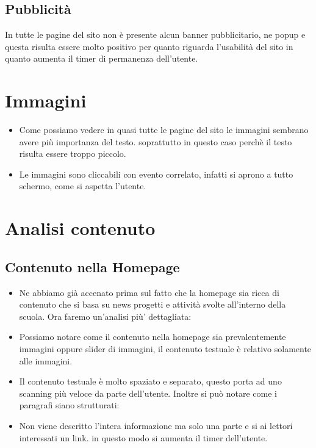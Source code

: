 \documentclass[12pt]{article}
\begin{document}
\subsection{Pubblicit\`a}
In tutte le pagine del sito non \`e presente alcun banner pubblicitario, ne popup e questa risulta essere molto positivo per quanto riguarda l'usabilit\`a del sito in quanto aumenta il timer di permanenza dell'utente.

\section{Immagini}
\begin{itemize}
\item Come possiamo vedere in quasi tutte le pagine del sito le immagini sembrano avere pi\`u importanza del testo. soprattutto in questo caso perch\`e il testo risulta essere troppo piccolo.

\item Le immagini sono cliccabili con evento correlato, infatti si aprono a tutto schermo, come si aspetta l'utente.
\end{itemize}

\section{Analisi contenuto}
\subsection{Contenuto nella Homepage}
\begin{itemize}
	\item Ne abbiamo gi\`a accenato prima sul fatto che la homepage sia ricca di contenuto che si basa su news progetti e attivit\`a svolte all'interno della scuola. Ora faremo un'analisi pi\`u' dettagliata:

	\item Possiamo notare come il contenuto nella homepage sia prevalentemente immagini oppure slider di immagini, il contenuto testuale \`e relativo solamente alle immagini. 
	\item Il contenuto testuale \`e  molto spaziato e separato, questo porta ad uno scanning pi\`u  veloce da parte dell'utente. Inoltre si pu\`o  notare come i paragrafi siano strutturati:

	\item Non viene descritto l'intera informazione ma solo una parte e si ai lettori interessati un link. in questo modo si aumenta il timer dell'utente.	 
\end{itemize}
\newpage
\end{document}
